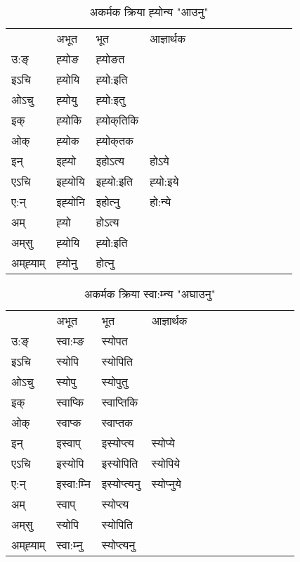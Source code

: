 \begin{table}[H]
\centering
\caption{\label{o.vi} अकर्मक क्रिया  ह्‍योन्य  "आउनु"  }
\begin{tabular}{l|l|l|l|l|l|l|l|l|l|l|l|l}  \toprule
&अभूत & भूत & आज्ञार्थक \\ 
उ:ङ्‌ &ह्‍योङ &ह्‍योङत \\ 
इऽचि &ह्‍योयि &ह्‍यो:इति   \\ 
ओऽचु &ह्‍योयु &ह्‍यो:इतु   \\ 
इक् &ह्‍योकि &ह्‍योक्‌तिकि   \\ 
ओक् &ह्‍योक &ह्‍योक्‌तक   \\ 
इन् & इह्‍यो & इहोऽत्य &होऽये  \\ 
एऽचि & इह्‍योयि & इह्‍यो:इति &ह्‍यो:इये    \\ 
ए:न् & इह्‍योनि  & इहोत्‍नु &हो:न्ये  \\ 
अम् & ह्‍यो & होऽत्य   \\ 
अम्‌सु & ह्‍योयि & ह्‍यो:इति     \\ 
अम्‌ह्‍याम् & ह्‍योनु  & होत्‍नु \\ 
\bottomrule
\end{tabular}
\end{table}


\begin{table}[H]
\centering
\caption{\label{op.vi} अकर्मक क्रिया  स्वा:म्‍न्य  "अघाउनु"  }
\begin{tabular}{l|l|l|l|l|l|l|l|l|l|l|l|l}  \toprule
&अभूत & भूत & आज्ञार्थक \\ 
उ:ङ्‌ &स्वा:म्ङ &स्योपत \\ 
इऽचि &स्योपि &स्योपिति   \\ 
ओऽचु &स्योपु &स्योपुतु   \\ 
इक् &स्वाप्कि &स्वाप्‍तिकि   \\ 
ओक् &स्वाप्क &स्वाप्‍तक   \\ 
इन् & इस्वाप् & इस्योप्‍त्य &स्योप्ये  \\ 
एऽचि & इस्योपि & इस्योपिति &स्योपिये    \\ 
ए:न् & इस्वा:म्‍नि  & इस्योप्‍त्यनु &स्योप्‍नुये  \\ 
अम् & स्वाप् & स्योप्‍त्य   \\ 
अम्‌सु & स्योपि & स्योपिति   \\ 
अम्‌ह्‍याम् & स्वा:म्‍नु  & स्योप्‍त्यनु \\ 
\bottomrule
\end{tabular}
\end{table}


